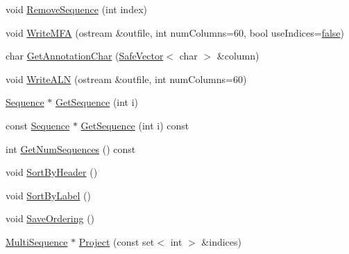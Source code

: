\begin{DoxyCompactItemize}
\item 
void \hyperlink{class_p_r_o_b_c_o_n_s_1_1_multi_sequence_a544a359ed76ce9b68e9d0e0ea575119c}{Remove\+Sequence} (int index)
\item 
void \hyperlink{class_p_r_o_b_c_o_n_s_1_1_multi_sequence_aec1123b3ca086c39514a8b58948a4628}{Write\+M\+F\+A} (ostream \&outfile, int num\+Columns=60, bool use\+Indices=\hyperlink{naview_8c_a65e9886d74aaee76545e83dd09011727}{false})
\item 
char \hyperlink{class_p_r_o_b_c_o_n_s_1_1_multi_sequence_aa39e095e71feef8649a8cc9c29ddc3ae}{Get\+Annotation\+Char} (\hyperlink{class_p_r_o_b_c_o_n_s_1_1_safe_vector}{Safe\+Vector}$<$ char $>$ \&column)
\item 
void \hyperlink{class_p_r_o_b_c_o_n_s_1_1_multi_sequence_a1b48c7ac2f959bcf478868bfe7772b7d}{Write\+A\+L\+N} (ostream \&outfile, int num\+Columns=60)
\item 
\hyperlink{class_p_r_o_b_c_o_n_s_1_1_sequence}{Sequence} $\ast$ \hyperlink{class_p_r_o_b_c_o_n_s_1_1_multi_sequence_a1ec546f0396cf54133920716ca27cd63}{Get\+Sequence} (int i)
\item 
const \hyperlink{class_p_r_o_b_c_o_n_s_1_1_sequence}{Sequence} $\ast$ \hyperlink{class_p_r_o_b_c_o_n_s_1_1_multi_sequence_add6302060d0dabe5c3ed52b13d13037f}{Get\+Sequence} (int i) const 
\item 
int \hyperlink{class_p_r_o_b_c_o_n_s_1_1_multi_sequence_a08c1adcbbd476649046724bf644c3286}{Get\+Num\+Sequences} () const 
\item 
void \hyperlink{class_p_r_o_b_c_o_n_s_1_1_multi_sequence_a37a441969876f74058c8ee7bc218141b}{Sort\+By\+Header} ()
\item 
void \hyperlink{class_p_r_o_b_c_o_n_s_1_1_multi_sequence_a65c41317536f201c1d0df9d03e9be5e3}{Sort\+By\+Label} ()
\item 
void \hyperlink{class_p_r_o_b_c_o_n_s_1_1_multi_sequence_ab0f074425a9fe4c5c81913d862276343}{Save\+Ordering} ()
\item 
\hyperlink{class_p_r_o_b_c_o_n_s_1_1_multi_sequence}{Multi\+Sequence} $\ast$ \hyperlink{class_p_r_o_b_c_o_n_s_1_1_multi_sequence_a67e3a9501aee86f5e17dd24133c0679e}{Project} (const set$<$ int $>$ \&indices)
\end{DoxyCompactItemize}


